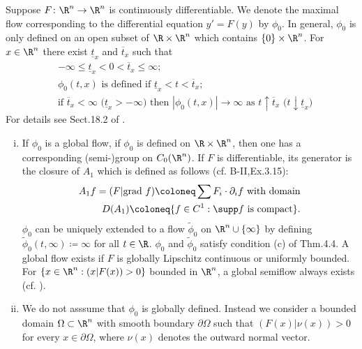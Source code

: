 \begin{example}\label{ex:b3-4.6}
	Suppose $F \colon \R^n \to \R^n$ is continuously differentiable.
	We denote the maximal flow corresponding to the differential equation $y' = F(y)$ by $\phi_{0}$.
	In general, $\phi_{0}$ is only defined on an open subset of $\R \times \R^n$ which contains $\{0\} \times \R^n$.
	For $x \in \R^n$ there exist $\underline{t}_{x}$ and $\overline{t}_{x}$ such that
	\begin{equation}\label{eq:b3-4.11}
		\begin{aligned}
			&-\infty \leq \underline{t}_{x} < 0 < \overline{t}_{x} \leq \infty; \\
			&\phi_{0}(t,x) \text{ is defined if } \underline{t}_{x} < t < \overline{t}_{x}; \\
			&\text{if } \overline{t}_{x} < \infty \text{ (}\underline{t}_{x} > -\infty\text{)} \text{ then } |\phi_{0}(t,x)| \to \infty \text{ as } t\uparrow\overline{t}_{x} \text{ (}t\downarrow\underline{t}_{x}\text{)}
		\end{aligned}
	\end{equation}
	For details see Sect.18.2 of \citet{dieudonné:1971}.
	\begin{enumerate}[(i), wide]
	\item
	If $\phi_{0}$ is a global flow, \ie if $\phi_{0}$ is defined on $\R \times \R^n$, then one has a corresponding (semi-)group on $C_{0}(\R^n)$.
	If $F$ is differentiable, its generator is the closure of $A_{1}$ which is defined as follows (cf. B-II,Ex.3.15):
	\begin{equation}\label{eq:b3-4.12}
		\begin{aligned}
			A_{1}f = (F|\text{grad }f) \coloneq \sum F_{i} \cdot \partial_{i}f \text{ with domain} \\
			D(A_{1}) \coloneq \{f \in C^1 : \supp f \text{ is compact}\}.
		\end{aligned}
	\end{equation}
	$\phi_{0}$ can be uniquely extended to a flow $\tilde{\phi}_{0}$ on $\R^n\cup\{\infty\}$ by defining $\tilde{\phi}_{0}(t,\infty) \coloneq \infty$ for all $t \in \R$.
	$\phi_{0}$ and $\tilde{\phi}_{0}$ satisfy condition (c) of Thm.4.4.
%
A global flow exists if $F$ is globally Lipschitz continuous or uniformly bounded. For $\{x \in \R^n : (x|F(x)) > 0\}$ bounded in $\R^n$, a global semiflow always exists (cf. \citet[Sec.5.2]{deimling:1977}).
	\item 
	We do not asssume that  $\phi_0$ is globally defined.
	Instead we consider a bounded domain $\Omega \subset \R^n$ with smooth boundary $\partial\Omega$ such that $(F(x)|\nu(x)) > 0$ for every $x \in \partial\Omega$, where $\nu(x)$ denotes the outward normal vector.
	

\end{enumerate}
\end{example}

